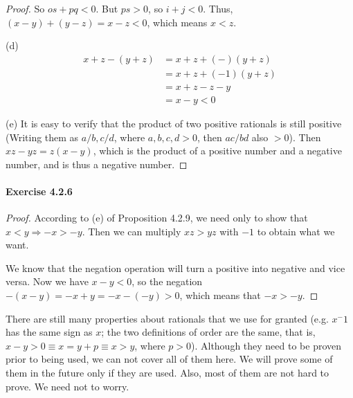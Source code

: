 \begin{proof}
So $os+pq<0$. But $ps>0$, so $i+j<0$. Thus, $(x-y) + (y-z) = x-z<0$, which means $x<z$.

(d)
\begin{align*}
x+z-(y+z) 
&= x+z + (-)(y+z) \\
&= x+z + (-1)(y+z) \\
&= x+z -z - y \\
&= x-y <0
\end{align*}

(e)
It is easy to verify that the product of two positive rationals is still positive (Writing them as 
$a/b,c/d$, where $a,b,c,d>0$, then $ac/bd$ also $>0$). Then $xz-yz=z(x-y)$, which is the product of a 
positive number and a negative number, and is thus a negative number.
\end{proof}

\paragraph{Exercise 4.2.6} \label{exercise4.2.6}
\begin{proof}
According to (e) of Proposition 4.2.9, we need only to show that $x<y \Longrightarrow -x>-y$. Then we can 
multiply $xz>yz$ with $-1$ to obtain what we want.

We know that the negation operation will turn a positive into negative and vice versa. Now we have 
$x-y<0$, so the negation $-(x-y) = -x+y = -x - (-y)>0$, which means that $-x>-y$.
\end{proof}

There are still many properties about rationals that we use for granted (e.g. $x^-1$ has the same sign as 
$x$; the two definitions of order are the same, that is, $x-y>0 \equiv x=y+p \equiv x>y$, where $p>0$). 
Although they need to be proven prior to being used, we can not cover all of them here. We will 
prove some of them in the future only if they are used. Also, most of them are not hard to prove. We need 
not to worry.